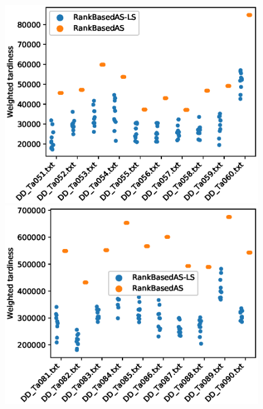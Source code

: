 \documentclass[runningheads]{llncs}
\begin{document}
\begin{figure}
    \centering
    \begin{minipage}{.48\textwidth}
		\centering
		\includegraphics[width=1.1\textwidth]{small-instances-LS-results.eps}
		\caption{}
		\label{small-instances-LS-results}
    \end{minipage}
    \hspace{0.02\textwidth}
    \begin{minipage}{.48\textwidth}
		\centering
		\includegraphics[width=1.1\textwidth]{large-instances-LS-results.eps}
		\caption{}
		\label{large-instances-LS-results}
    \end{minipage}
\end{figure}
\end{document}
